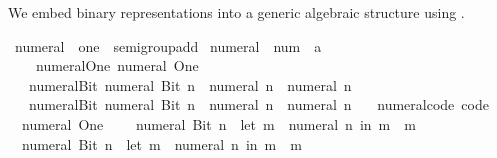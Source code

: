 \begin{isabellebody}
\endisatagproof
{\isafoldproof}%
%
\isadelimproof
%
\endisadelimproof
%
\isadelimdocument
%
\endisadelimdocument
%
\isatagdocument
%
\isamarkuptrue%
%
\endisatagdocument
{\isafolddocument}%
%
\isadelimdocument
%
\endisadelimdocument
%
\begin{isamarkuptext}%
We embed binary representations into a generic algebraic
  structure using .%
\end{isamarkuptext}\isamarkuptrue%
\isamarkupfalse%
\ numeral\ {\isacharequal}{\kern0pt}\ one\ {\isacharplus}{\kern0pt}\ semigroup{\isacharunderscore}{\kern0pt}add\isanewline
{}\isanewline
\isanewline
{}\isamarkupfalse%
\ numeral\ {\isacharcolon}{\kern0pt}{\isacharcolon}{\kern0pt}\ {\isachardoublequoteopen}num\ {\isasymRightarrow}\ {\isacharprime}{\kern0pt}a{\isachardoublequoteclose}\isanewline
\ \ \isanewline
\ \ \ \ numeral{\isacharunderscore}{\kern0pt}One{\isacharcolon}{\kern0pt}\ {\isachardoublequoteopen}numeral\ One\ {\isacharequal}{\kern0pt}\ {}{\isachardoublequoteclose}\isanewline
\ \ {\isacharbar}{\kern0pt}\ numeral{\isacharunderscore}{\kern0pt}Bit{}{\isacharcolon}{\kern0pt}\ {\isachardoublequoteopen}numeral\ {\isacharparenleft}{\kern0pt}Bit{}\ n{\isacharparenright}{\kern0pt}\ {\isacharequal}{\kern0pt}\ numeral\ n\ {\isacharplus}{\kern0pt}\ numeral\ n{\isachardoublequoteclose}\isanewline
\ \ {\isacharbar}{\kern0pt}\ numeral{\isacharunderscore}{\kern0pt}Bit{}{\isacharcolon}{\kern0pt}\ {\isachardoublequoteopen}numeral\ {\isacharparenleft}{\kern0pt}Bit{}\ n{\isacharparenright}{\kern0pt}\ {\isacharequal}{\kern0pt}\ numeral\ n\ {\isacharplus}{\kern0pt}\ numeral\ n\ {\isacharplus}{\kern0pt}\ {}{\isachardoublequoteclose}\isanewline
\isanewline
{}\isamarkupfalse%
\ numeral{\isacharunderscore}{\kern0pt}code\ {\isacharbrackleft}{\kern0pt}code{\isacharbrackright}{\kern0pt}{\isacharcolon}{\kern0pt}\isanewline
\ \ {\isachardoublequoteopen}numeral\ One\ {\isacharequal}{\kern0pt}\ {}{\isachardoublequoteclose}\isanewline
\ \ {\isachardoublequoteopen}numeral\ {\isacharparenleft}{\kern0pt}Bit{}\ n{\isacharparenright}{\kern0pt}\ {\isacharequal}{\kern0pt}\ {\isacharparenleft}{\kern0pt}let\ m\ {\isacharequal}{\kern0pt}\ numeral\ n\ in\ m\ {\isacharplus}{\kern0pt}\ m{\isacharparenright}{\kern0pt}{\isachardoublequoteclose}\isanewline
\ \ {\isachardoublequoteopen}numeral\ {\isacharparenleft}{\kern0pt}Bit{}\ n{\isacharparenright}{\kern0pt}\ {\isacharequal}{\kern0pt}\ {\isacharparenleft}{\kern0pt}let\ m\ {\isacharequal}{\kern0pt}\ numeral\ n\ in\ m\ {\isacharplus}{\kern0pt}\ m\ {\isacharplus}{\kern0pt}\ {}{\isacharparenright}{\kern0pt}{\isachardoublequoteclose}\isanewline

\end{isabellebody}
